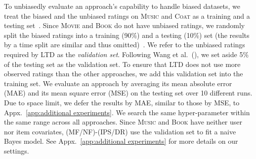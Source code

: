 \documentclass[letterpaper]{article} %
\begin{document}
To unbiasedly evaluate an approach's capability to handle biased datasets, we treat the biased and the unbiased ratings on \textsc{Music} and \textsc{Coat} as a training and a testing set~\cite{schnabel2016recommendations}.
Since \textsc{Movie} and \textsc{Book} do not have unbiased ratings, we randomly split the biased ratings into a training (90\%) and a testing (10\%) set (the results by a time split are similar and thus omitted)~\cite{li2017ermma}.
We refer to the unbiased ratings required by LTD as the \emph{validation set}.
Following Wang et al.~(\citeyear{wang2019doubly}), we set aside 5\% of the testing set as the validation set.
To ensure that LTD does not use more observed ratings than the other approaches, we add this validation set into the training set.
We evaluate an approach by averaging its mean absolute error (MAE) and its mean square error (MSE) on the testing set over 10 different runs.
Due to space limit, we defer the results by MAE, similar to those by MSE, to Appx.~\ref{app:additional experiments}.
We search the same hyper-parameter within the same range across all approaches.
Since \textsc{Music} and \textsc{Book} have neither user nor item covariates, (MF/NF)-(IPS/DR) use the validation set to fit a naive Bayes model.
See Appx.~\ref{app:additional experiments} for more details on our settings.
\end{document}
